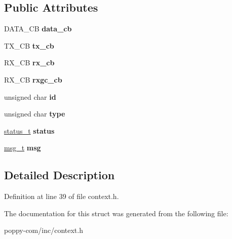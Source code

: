 \subsection*{\-Public \-Attributes}
\begin{DoxyCompactItemize}
\item 
\hypertarget{structcontext__t_ae79525e2fb5ec4ad5b6beb03c0fd9579}{\-D\-A\-T\-A\-\_\-\-C\-B {\bfseries data\-\_\-cb}}\label{structcontext__t_ae79525e2fb5ec4ad5b6beb03c0fd9579}

\item 
\hypertarget{structcontext__t_a06d2b435c29a01be998e6383fec2ef50}{\-T\-X\-\_\-\-C\-B {\bfseries tx\-\_\-cb}}\label{structcontext__t_a06d2b435c29a01be998e6383fec2ef50}

\item 
\hypertarget{structcontext__t_a9d4451da3b62a2ec269ae7fd2f6b24b8}{\-R\-X\-\_\-\-C\-B {\bfseries rx\-\_\-cb}}\label{structcontext__t_a9d4451da3b62a2ec269ae7fd2f6b24b8}

\item 
\hypertarget{structcontext__t_a108cbe016d12bac90d1582ed0cca91e8}{\-R\-X\-\_\-\-C\-B {\bfseries rxgc\-\_\-cb}}\label{structcontext__t_a108cbe016d12bac90d1582ed0cca91e8}

\item 
\hypertarget{structcontext__t_afcfccef1ae4111aee136acf0d92b4379}{unsigned char {\bfseries id}}\label{structcontext__t_afcfccef1ae4111aee136acf0d92b4379}

\item 
\hypertarget{structcontext__t_a2dbb966924ef90bfba1876ad8a3872af}{unsigned char {\bfseries type}}\label{structcontext__t_a2dbb966924ef90bfba1876ad8a3872af}

\item 
\hypertarget{structcontext__t_a0e49b82a79be5df63399ddbcc0cc022c}{\hyperlink{structstatus__t}{status\-\_\-t} {\bfseries status}}\label{structcontext__t_a0e49b82a79be5df63399ddbcc0cc022c}

\item 
\hypertarget{structcontext__t_ae806cd53ff68971d122ab6f854d22b8d}{\hyperlink{structmsg__t}{msg\-\_\-t} {\bfseries msg}}\label{structcontext__t_ae806cd53ff68971d122ab6f854d22b8d}

\end{DoxyCompactItemize}


\subsection{\-Detailed \-Description}


\-Definition at line 39 of file context.\-h.



\-The documentation for this struct was generated from the following file\-:\begin{DoxyCompactItemize}
\item 
poppy-\/com/inc/context.\-h\end{DoxyCompactItemize}
